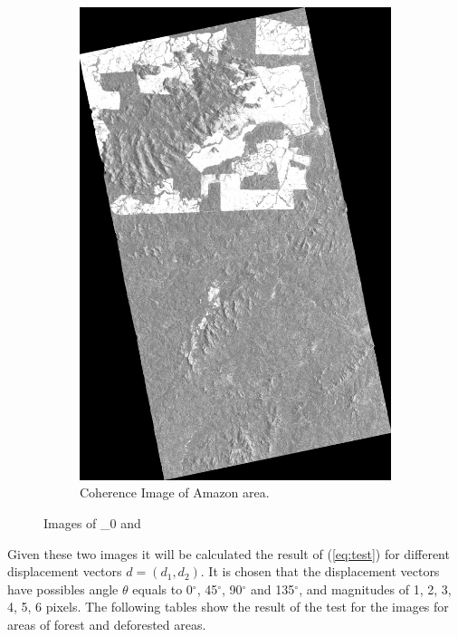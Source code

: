 \begin{figure}[H]
\begin{subfigure}[b]{0.4\linewidth}
      \includegraphics[width=0.8\linewidth]{Chapter4/coSSC_master_gamma_vol.png}
      \caption{Coherence Image of Amazon area.}
    \end{subfigure}
  \caption{Images of \beta_0 and \gamma}
  \label{fig:asdf}
\end{figure}

Given these two images it will be calculated the result of (\ref{eq:test}) for different displacement vectors
$d=(d_1, d_2)$. It is chosen that the displacement vectors have possibles angle $\theta$ equals to 0$^{\circ}$, 45$^{\circ}$, 90$^{\circ}$ and 135$^{\circ}$, and magnitudes of 1, 2, 3, 4, 5, 6 pixels.
The following tables show the result of the test for the images for areas of forest and deforested areas.



